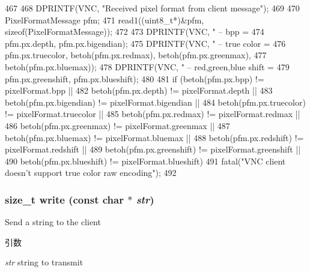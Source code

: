 \begin{DoxyCode}
467 {
468     DPRINTF(VNC, "Received pixel format from client message\n");
469 
470     PixelFormatMessage pfm;
471     read1((uint8_t*)&pfm, sizeof(PixelFormatMessage));
472 
473     DPRINTF(VNC, " -- bpp = %
474             pfm.px.depth, pfm.px.bigendian);
475     DPRINTF(VNC, " -- true color = %
476             pfm.px.truecolor, betoh(pfm.px.redmax), betoh(pfm.px.greenmax),
477                 betoh(pfm.px.bluemax));
478     DPRINTF(VNC, " -- red,green,blue shift = %
479             pfm.px.greenshift, pfm.px.blueshift);
480 
481     if (betoh(pfm.px.bpp) != pixelFormat.bpp ||
482         betoh(pfm.px.depth) != pixelFormat.depth ||
483         betoh(pfm.px.bigendian) != pixelFormat.bigendian ||
484         betoh(pfm.px.truecolor) != pixelFormat.truecolor ||
485         betoh(pfm.px.redmax) != pixelFormat.redmax ||
486         betoh(pfm.px.greenmax) != pixelFormat.greenmax ||
487         betoh(pfm.px.bluemax) != pixelFormat.bluemax ||
488         betoh(pfm.px.redshift) != pixelFormat.redshift ||
489         betoh(pfm.px.greenshift) != pixelFormat.greenshift ||
490         betoh(pfm.px.blueshift) != pixelFormat.blueshift)
491         fatal("VNC client doesn't support true color raw encoding\n");
492 }
\end{DoxyCode}
\hypertarget{classVncServer_add50e5436017b9c2f1e0d11c9476bf1b}{
\subsubsection[{write}]{\setlength{\rightskip}{0pt plus 5cm}size\_\-t write (const char $\ast$ {\em str})}}
\label{classVncServer_add50e5436017b9c2f1e0d11c9476bf1b}
Send a string to the client 
\begin{DoxyParams}{引数}
\item[{\em str}]string to transmit \end{DoxyParams}



